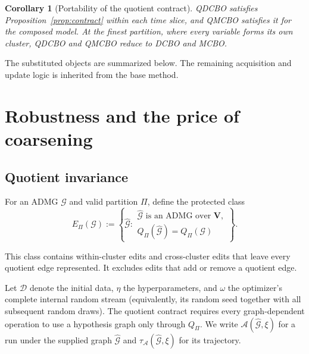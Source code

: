 \documentclass[twoside]{article}
\newtheorem{corollary}{Corollary}
\newcommand{\Gg}{\mathcal{G}}
\begin{document}
\begin{corollary}[Portability of the quotient contract]
\label{cor:portability}
QDCBO satisfies Proposition~\ref{prop:contract} within each time slice, and QMCBO satisfies it for the composed model. At the finest partition, where every variable forms its own cluster, QDCBO and QMCBO reduce to DCBO and MCBO.
\end{corollary}

The substituted objects are summarized below. The remaining acquisition and update logic is inherited from the base method.

\begin{center}
\small
{}
\end{center}

\section{Robustness and the price of coarsening}
\label{sec:theory}

\subsection{Quotient invariance}
\label{sec:invariance}

For an ADMG $\Gg$ and valid partition $\Pi$, define the protected class
\begin{equation}
E_\Pi(\mathcal G)
:=
\left\{
\widehat{\mathcal G}:
\begin{array}{l}
\widehat{\mathcal G}\text{ is an ADMG over }\mathbf V,\\
Q_\Pi(\widehat{\mathcal G})=Q_\Pi(\mathcal G)
\end{array}
\right\}.
\label{eq:protected-class}
\end{equation}

This class contains within-cluster edits and cross-cluster edits that leave every quotient edge represented. It excludes edits that add or remove a quotient edge.

Let $\mathcal D$ denote the initial data, $\eta$ the hyperparameters, and $\omega$ the optimizer's complete internal random stream (equivalently, its random seed together with all subsequent random draws). The quotient contract requires every graph-dependent operation to use a hypothesis graph only through $Q_\Pi$. We write $\mathcal A(\widehat{\mathcal G},\xi)$ for a run under the supplied graph $\widehat{\mathcal G}$ and $\tau_{\mathcal A}(\widehat{\mathcal G},\xi)$ for its trajectory. 
\end{document}
